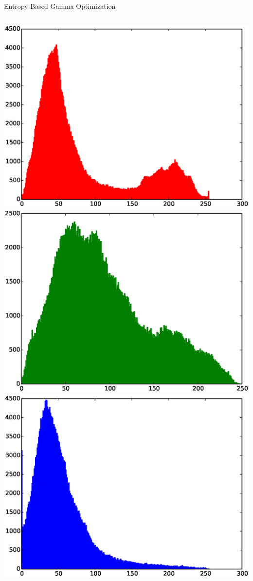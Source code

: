 \documentclass[compress,aspectratio=43]{beamer}
\begin{document}
\begin{frame}{Entropy-Based Gamma Optimization}
\begin{columns}[t]
\includegraphics[width=1\linewidth]{figures/gamma/flower/flower-r.eps}\\
\includegraphics[width=1\linewidth]{figures/gamma/flower/flower-g.eps}\\
\includegraphics[width=1\linewidth]{figures/gamma/flower/flower-b.eps}\\

\end{columns}
\end{frame}
\end{document}
